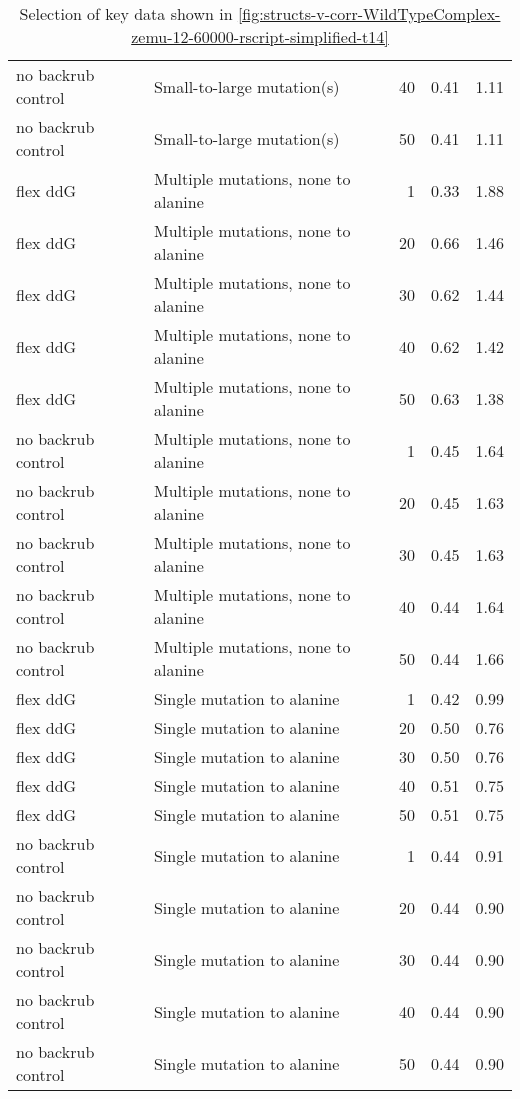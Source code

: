\begin{table}
\begin{tabular}{llrrr}
 no backrub control &           Small-to-large mutation(s) &          40 & 0.41 & 1.11 \\
 no backrub control &           Small-to-large mutation(s) &          50 & 0.41 & 1.11 \\
           flex ddG &  Multiple mutations, none to alanine &           1 & 0.33 & 1.88 \\
           flex ddG &  Multiple mutations, none to alanine &          20 & 0.66 & 1.46 \\
           flex ddG &  Multiple mutations, none to alanine &          30 & 0.62 & 1.44 \\
           flex ddG &  Multiple mutations, none to alanine &          40 & 0.62 & 1.42 \\
           flex ddG &  Multiple mutations, none to alanine &          50 & 0.63 & 1.38 \\
 no backrub control &  Multiple mutations, none to alanine &           1 & 0.45 & 1.64 \\
 no backrub control &  Multiple mutations, none to alanine &          20 & 0.45 & 1.63 \\
 no backrub control &  Multiple mutations, none to alanine &          30 & 0.45 & 1.63 \\
 no backrub control &  Multiple mutations, none to alanine &          40 & 0.44 & 1.64 \\
 no backrub control &  Multiple mutations, none to alanine &          50 & 0.44 & 1.66 \\
           flex ddG &           Single mutation to alanine &           1 & 0.42 & 0.99 \\
           flex ddG &           Single mutation to alanine &          20 & 0.50 & 0.76 \\
           flex ddG &           Single mutation to alanine &          30 & 0.50 & 0.76 \\
           flex ddG &           Single mutation to alanine &          40 & 0.51 & 0.75 \\
           flex ddG &           Single mutation to alanine &          50 & 0.51 & 0.75 \\
 no backrub control &           Single mutation to alanine &           1 & 0.44 & 0.91 \\
 no backrub control &           Single mutation to alanine &          20 & 0.44 & 0.90 \\
 no backrub control &           Single mutation to alanine &          30 & 0.44 & 0.90 \\
 no backrub control &           Single mutation to alanine &          40 & 0.44 & 0.90 \\
 no backrub control &           Single mutation to alanine &          50 & 0.44 & 0.90 \\
\bottomrule
\end{tabular}

\caption[]{Selection of key data shown in \cref{fig:structs-v-corr-WildTypeComplex-zemu-12-60000-rscript-simplified-t14}}
\label{tab:structs-v-corr-WildTypeComplex-zemu-12-60000-rscript-simplified-t14-underlying-data}
\end{table}
